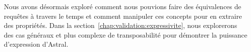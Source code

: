 Nous avons désormais exploré comment nous pouvions faire des équivalences de requêtes à travers le temps et comment manipuler ces concepts pour en extraire des propriétés. Dans la section~\ref{chap:validation:expressivite}, nous explorerons des cas généraux et plus complexe de transposabilité pour démontrer la puissance d'expression d'Astral.
